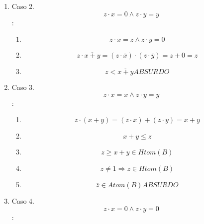 \begin{enumerate}
\begin{enumerate}
\begin{enumerate}
\begin{enumerate}
\begin{enumerate}
\begin{enumerate}
            \begin{enumerate}
            \def\labelenumvii{\arabic{enumvii}.}
            \tightlist
            \item
              \[{{z \cdot \overline{x}} = {{0 \land z} \cdot \overline{y}}} = z\]
            \item
              \[{{{z \cdot \overline{x+y}} = {{({z \cdot \overline{x}})} \cdot {({z \cdot \overline{y}})}}} = {0 + z}} = z\]
            \item
              \[{z < \overline{x+y}}\mathit{ABSURDO}\]
            \end{enumerate}
          \item
            Caso 2. \[{{z \cdot x} = {{0 \land z} \cdot y}} = y\]:

            \begin{enumerate}
            \def\labelenumvii{\arabic{enumvii}.}
            \tightlist
            \item
              \[{{z \cdot \overline{x}} = {{z \land z} \cdot \overline{y}}} = 0\]
            \item
              \[{{{z \cdot \overline{x+y}} = {{({z \cdot \overline{x}})} \cdot {({z \cdot \overline{y}})}}} = {z + 0}} = z\]
            \item
              \[{z < \overline{x+y}}\mathit{ABSURDO}\]
            \end{enumerate}
          \item
            Caso 3.\[{{z \cdot x} = {{x \land z} \cdot y}} = y\]:

            \begin{enumerate}
            \def\labelenumvii{\arabic{enumvii}.}
            \tightlist
            \item
              \[{{z \cdot {({x + y})}} = {{({z \cdot x})} + {({z \cdot y})}}} = {x + y}\]
            \item
              \[{x + y} \leq z\]
            \item
              \[{{z \geq {x + y}} \in \mathit{Htom}}{(B)}\]
            \item
              \[{z \neq 1}\Rightarrow{z \in \mathit{Htom}}{(B)}\]
            \item
              \[{\overline{z} \in \mathit{Atom}}{(B)}\mathit{ABSURDO}\]
            \end{enumerate}
          \item
            Caso 4.\[{{z \cdot x} = {{0 \land z} \cdot y}} = 0\]:


\end{enumerate}
\end{enumerate}
\end{enumerate}
\end{enumerate}
\end{enumerate}
\end{enumerate}
